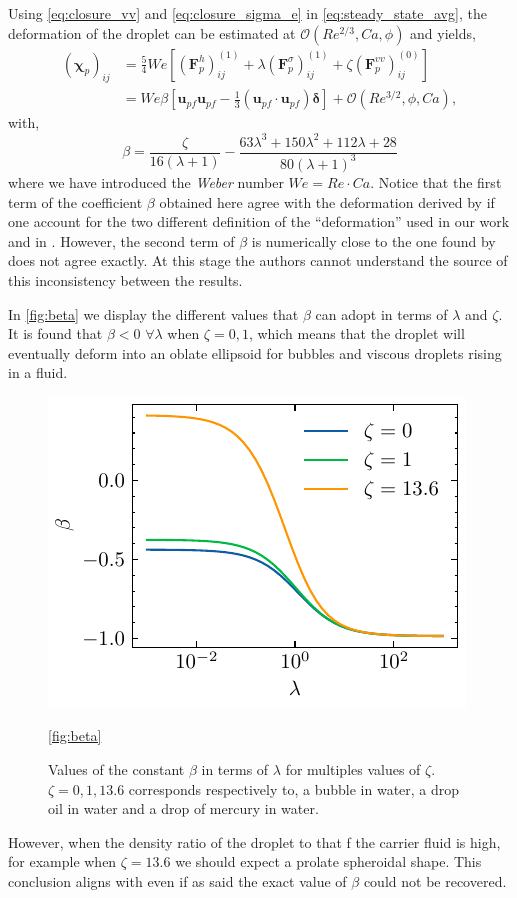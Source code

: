 Using \ref{eq:closure_vv} and \ref{eq:closure_sigma_e} in  \ref{eq:steady_state_avg}, the deformation of the droplet can be estimated at $\mathcal{O}(Re^{2/3},Ca,\phi)$ and yields, 
\begin{align*}
    (\bm\chi_{p})_{ij}
    &= 
    \frac{5}{4}We \left[
        (\textbf{F}_p^h )_{ij}^{(1)}
        + \lambda (\textbf{F}_p^{\sigma})_{ij}^{(1)}
        + \zeta (\textbf{F}_p^{vv})_{ij}^{(0)}
    \right]\\
    &= We \beta [\textbf{u}_{pf}\textbf{u}_{pf} - \frac{1}{3}(\textbf{u}_{pf}\cdot \textbf{u}_{pf})\bm\delta ]
    + \mathcal{O}(Re^{3/2},\phi,Ca),
\end{align*}
with, 
\begin{equation*}
    \beta = 
    \frac{\zeta}{16 \left(\lambda + 1\right)} 
    - \frac{63 \lambda^{3} + 150 \lambda^{2} + 112 \lambda + 28}{80 \left(\lambda + 1\right)^{3}}
\end{equation*}
where we have introduced the \textit{Weber} number $We = Re \cdot Ca$. 
Notice that the first term of the coefficient $\beta$ obtained here agree with the deformation derived by \citet{taylor1964deformation} if one account for the two different definition of the ``deformation'' used in our work and in \citet{taylor1964deformation}.
However, the second term of $\beta$ is numerically close to the one found by \citet{taylor1964deformation} does not agree exactly.
At this stage the authors cannot understand the source of this inconsistency between the results. 

In \ref{fig:beta} we display the different values that $\beta$ can adopt in terms of $\lambda$ and $\zeta$. 
It is found that $\beta < 0$ $\forall \lambda$ when  $\zeta = 0, 1$, which means that the droplet will eventually deform into an oblate ellipsoid for bubbles and viscous droplets rising in a fluid. 
\begin{figure}[h!]
    \centering
    \includegraphics[height=0.25\textwidth]{image/Theory/beta.pdf}
    \caption{Values of the constant $\beta$ in terms of $\lambda$ for multiples values of $\zeta$. 
    $\zeta = 0,1,13.6$ corresponds respectively to, a bubble in water, a drop oil in water and a drop of mercury in water. }
    \ref{fig:beta}
\end{figure}
However, when the density ratio of the droplet to that f the carrier fluid is high, for example when $\zeta = 13.6$ we should expect a prolate spheroidal shape. 
This conclusion aligns with \citet{taylor1964deformation} even if as said the exact value of $\beta$ could not be recovered. 

